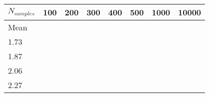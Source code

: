 \documentclass[11pt]{article}
\begin{document}
    \begin{longtable}[]{@{}llllllll@{}}
\toprule
\begin{minipage}[b]{0.10\columnwidth}\raggedright
\(N_{samples}\)\strut
\end{minipage} & \begin{minipage}[b]{0.10\columnwidth}\raggedright
100\strut
\end{minipage} & \begin{minipage}[b]{0.10\columnwidth}\raggedright
200\strut
\end{minipage} & \begin{minipage}[b]{0.10\columnwidth}\raggedright
300\strut
\end{minipage} & \begin{minipage}[b]{0.10\columnwidth}\raggedright
400\strut
\end{minipage} & \begin{minipage}[b]{0.10\columnwidth}\raggedright
500\strut
\end{minipage} & \begin{minipage}[b]{0.10\columnwidth}\raggedright
1000\strut
\end{minipage} & \begin{minipage}[b]{0.10\columnwidth}\raggedright
10000\strut
\end{minipage}\tabularnewline
\midrule
\endhead
\begin{minipage}[t]{0.10\columnwidth}\raggedright
Mean\strut
\end{minipage} & \begin{minipage}[t]{0.10\columnwidth}\raggedright
\(\begin{array}{cc}1.93\\1.73\end{array}\)\strut
\end{minipage} & \begin{minipage}[t]{0.10\columnwidth}\raggedright
\(\begin{array}{cc}1.93\\1.87\end{array}\)\strut
\end{minipage} & \begin{minipage}[t]{0.10\columnwidth}\raggedright
\(\begin{array}{cc}2.0\\2.06\end{array}\)\strut
\end{minipage} & \begin{minipage}[t]{0.10\columnwidth}\raggedright
\(\begin{array}{cc}2.05\\2.27\end{array}\)\strut

\end{minipage}
\end{longtable}
\end{document}
